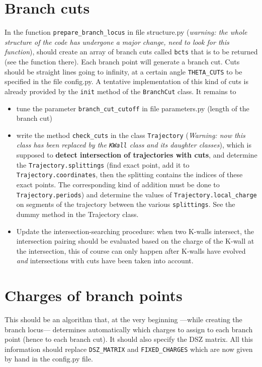 \documentclass[11pt]{report}
\begin{document}
\section{Branch cuts}
In the function {\tt prepare\_branch\_locus} in file structure.py (\emph{warning: the whole structure of the code has undergone a major change, need to look for this function}), should create an array of branch cuts called {\tt bcts} that is to be returned (see the function there).
Each branch point will generate a branch cut. Cuts should be straight lines going to infinity, at a certain angle {\tt THETA\_CUTS} to be specified in the file {config.py}. A tentative implementation of this kind of cuts is already provided by the {\tt init} method of the {\tt BranchCut} class.
It remains to
\begin{itemize}
\item tune the parameter {\tt branch\_cut\_cutoff} in file parameters.py (length of the branch cut)
\item write the method {\tt check\_{cuts}} in the class {\tt Trajectory} (\emph{Warning: now this class has been replaced by the {\tt KWall} class and its daughter classes}), which is supposed to {\bf detect intersection of trajectories with cuts}, and determine the {\tt Trajectory.splittings} (find exact point, add it to {\tt Trajectory.coordinates}, then the splitting contains the indices of these exact points. The corresponding kind of addition must be done to {\tt Trajectory.periods}) and determine the values of {\tt Trajectory.local\_{charge}} on segments of the trajectory between the various {\tt splittings}. See the dummy method in the Trajectory class.
\item Update the intersection-searching procedure: when two K-walls intersect, the intersection pairing should be evaluated based on the charge of the K-wall at the intersection, this of course can only happen after K-walls have evolved \emph{and} intersections with cuts have been taken into account.
\end{itemize}



\section{Charges of branch points}
This should be an algorithm that, at the very beginning ---while creating the branch locus--- determines automatically which charges to assign to each branch point (hence to each branch cut).
It should also specify the DSZ matrix. All this information should replace {\tt DSZ\_MATRIX} and {\tt FIXED\_CHARGES} which are now given by hand in the config.py file.
\end{document}
